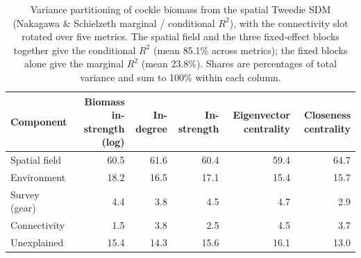 \begin{table}[ht]
\centering
\caption{Variance partitioning of cockle biomass from the spatial Tweedie SDM (Nakagawa \& Schielzeth marginal / conditional $R^2$), with the connectivity slot rotated over five metrics. The spatial field and the three fixed-effect blocks together give the conditional $R^2$ (mean 85.1\% across metrics); the fixed blocks alone give the marginal $R^2$ (mean 23.8\%). Shares are percentages of total variance and sum to 100\% within each column.}
\label{tab:variance-partitioning}
\begin{tabular}{lrrrrr}
\toprule
Component & Biomass in-strength (log) & In-degree & In-strength & Eigenvector centrality & Closeness centrality \\
\midrule
Spatial field & 60.5 & 61.6 & 60.4 & 59.4 & 64.7 \\
Environment & 18.2 & 16.5 & 17.1 & 15.4 & 15.7 \\
Survey (gear) & 4.4 & 3.8 & 4.5 & 4.7 & 2.9 \\
Connectivity & 1.5 & 3.8 & 2.5 & 4.5 & 3.7 \\
\midrule
Unexplained & 15.4 & 14.3 & 15.6 & 16.1 & 13.0 \\
\bottomrule
\end{tabular}
\end{table}
